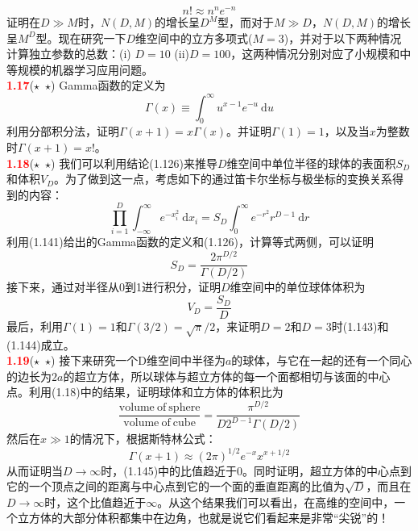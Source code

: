 \documentclass{book}
\numberwithin{equation}{chapter}
\begin{document}
{	\begin{equation}
		n! \approx n^n e^{-n}
	\end{equation}
	证明在$D \gg M$时，$N(D,M)$的增长呈$D^M$型，而对于$M \gg D$，$N(D,M)$的增长呈$M^D$型。现在研究一下$D$维空间中的立方多项式($M=3$)，并对于以下两种情况计算独立参数的总数：(i) $D=10$ (ii)$D=100$，这两种情况分别对应了小规模和中等规模的机器学习应用问题。\\
	\textcolor{red}{\textbf{1.17}}\quad ($\star$\ $\star$) Gamma函数的定义为
	\begin{equation}
		\Gamma(x)\equiv \int_0^{\infty} u^{x-1}e^{-u}\ \mathrm{d}u
	\end{equation}
	利用分部积分法，证明$\Gamma(x+1)=x\Gamma(x)$。并证明$\Gamma(1)=1$，以及当$x$为整数时$\Gamma(x+1)=x!$。\\
	\textcolor{red}{\textbf{1.18}}\quad ($\star$\ $\star$) 我们可以利用结论(1.126)来推导$D$维空间中单位半径的球体的表面积$S_D$和体积$V_D$。为了做到这一点，考虑如下的通过笛卡尔坐标与极坐标的变换关系得到的内容：
	\begin{equation}
		\prod_{i=1}^{D}\int_{-\infty}^{\infty}e^{-x_i^2} \ \mathrm{d}x_i = S_D\int_0^{\infty}e^{-r^2}r^{D-1}\ \mathrm{d}r
	\end{equation}
	利用(1.141)给出的Gamma函数的定义和(1.126)，计算等式两侧，可以证明
	\begin{equation}
		S_D=\frac{2\pi^{D/2}}{\Gamma(D/2)}
	\end{equation}
	接下来，通过对半径从0到1进行积分，证明$D$维空间中的单位球体体积为
	\begin{equation}
		V_D=\frac{S_D}{D}
	\end{equation}
	最后，利用$\Gamma(1)=1$和$\Gamma(3/2)=\sqrt{\pi}/2$，来证明$D=2$和$D=3$时(1.143)和(1.144)成立。\\
	\textcolor{red}{\textbf{1.19}}\quad ($\star$\ $\star$) 接下来研究一个D维空间中半径为$a$的球体，与它在一起的还有一个同心的边长为$2a$的超立方体，所以球体与超立方体的每一个面都相切与该面的中心点。利用(1.18)中的结果，证明球体和立方体的体积比为
	\begin{equation}
		\frac{\mathrm{volume\ of\ sphere}}{\mathrm{volume\ of\ cube}}=\frac{\pi^{D/2}}{D2^{D-1}\Gamma(D/2)}
	\end{equation}
	然后在$x \gg 1$的情况下，根据斯特林公式：
	\begin{equation}
		\Gamma(x+1)\approx (2\pi)^{1/2}e^{-x}x^{x+1/2}
	\end{equation}
	从而证明当$D \rightarrow \infty$时，(1.145)中的比值趋近于0。同时证明，超立方体的中心点到它的一个顶点之间的距离与中心点到它的一个面的垂直距离的比值为$\sqrt{D}$，而且在$D \rightarrow \infty$时，这个比值趋近于$\infty$。从这个结果我们可以看出，在高维的空间中，一个立方体的大部分体积都集中在边角，也就是说它们看起来是非常“尖锐”的！\\
}
\end{document}
